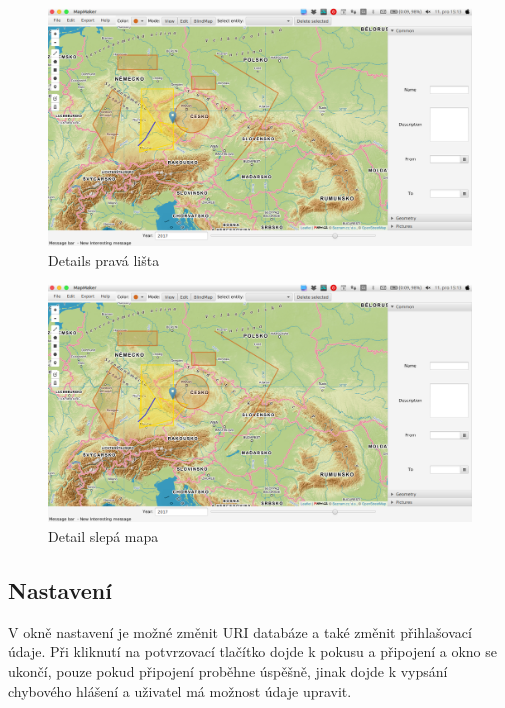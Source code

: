 \documentclass[12pt,a4paper,titlepage]{article}
\begin{document}
\begin{figure}[!htbp]
	\centering
	\includegraphics[scale=0.25]{full_window}
	\caption{Details pravá lišta}
	\label{rightBar}
\end{figure}

\begin{figure}[!htbp]
	\centering
	\includegraphics[scale=0.25]{full_window}
	\caption{Detail slepá mapa}
	\label{blindMap}
\end{figure}

\subsection{Nastavení}
V okně nastavení je možné změnit URI databáze a také změnit přihlašovací údaje. Při kliknutí na potvrzovací tlačítko dojde k pokusu a připojení a okno se ukončí, pouze pokud připojení proběhne úspěšně, jinak dojde k vypsání chybového hlášení a uživatel má možnost údaje upravit.
\end{document}
